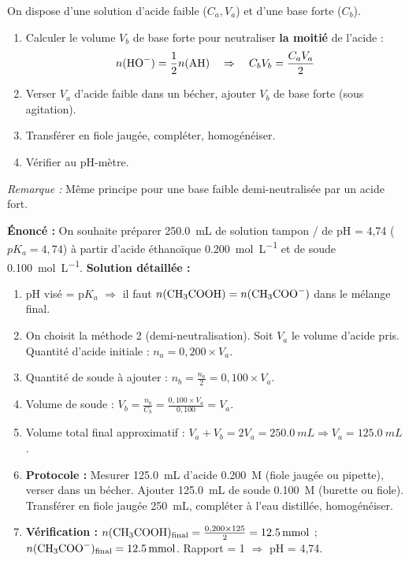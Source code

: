 \documentclass[11pt]{article}
\begin{document}
\begin{methode}[Préparer un tampon de pH = pKa (Méthode 2 : Demi-neutralisation)]
On dispose d'une solution d'acide faible  ($C_a, V_a$) et d'une base forte  ($C_b$).
\begin{enumerate}
  \item Calculer le volume $V_b$ de base forte pour neutraliser \textbf{la moitié} de l'acide :
  \[ n(\ce{HO-}) = \frac{1}{2} n(\ce{AH}) \quad \Rightarrow \quad C_b V_b = \frac{C_a V_a}{2} \]
  \item Verser $V_a$ d'acide faible dans un bécher, ajouter $V_b$ de base forte (sous agitation).
  \item Transférer en fiole jaugée, compléter, homogénéiser.
  \item Vérifier au pH-mètre.
\end{enumerate}
\emph{Remarque :} Même principe pour une base faible  demi-neutralisée par un acide fort.
\end{methode}

\begin{exoresolu}[Préparation d'un tampon acétate pH = 4,74]
\textbf{Énoncé :} On souhaite préparer \SI{250,0}{mL} de solution tampon / de pH = 4,74 ($pK_a = 4,74$) à partir d'acide éthanoïque \SI{0,200}{mol.L^{-1}} et de soude \SI{0,100}{mol.L^{-1}}.
\textbf{Solution détaillée :}
\begin{enumerate}
  \item pH visé = $\mathrm{p}K_a$ $\Rightarrow$ il faut $n(\ce{CH3COOH}) = n(\ce{CH3COO-})$ dans le mélange final.
  \item On choisit la méthode 2 (demi-neutralisation). Soit $V_a$ le volume d'acide pris. Quantité d'acide initiale : $n_a = 0,200 \times V_a$.
  \item Quantité de soude à ajouter : $n_b = \frac{n_a}{2} = 0,100 \times V_a$.
  \item Volume de soude : $V_b = \frac{n_b}{C_b} = \frac{0,100 \times V_a}{0,100} = V_a$.
  \item Volume total final approximatif : $V_a + V_b = 2 V_a = \SI{250,0}{mL} \Rightarrow V_a = \SI{125,0}{mL}$.
  \item \textbf{Protocole :} Mesurer \SI{125,0}{mL} d'acide \SI{0,200}{M} (fiole jaugée ou pipette), verser dans un bécher. Ajouter \SI{125,0}{mL} de soude \SI{0,100}{M} (burette ou fiole). Transférer en fiole jaugée \SI{250}{mL}, compléter à l'eau distillée, homogénéiser.
  \item \textbf{Vérification :} $n(\ce{CH3COOH})_{\text{final}} = \frac{0,200 \times 125}{2} = \SI{12,5}{mmol}$ ; $n(\ce{CH3COO-})_{\text{final}} = \SI{12,5}{mmol}$. Rapport = 1 $\Rightarrow$ pH = 4,74.
\end{enumerate}
\end{exoresolu}
\end{document}
